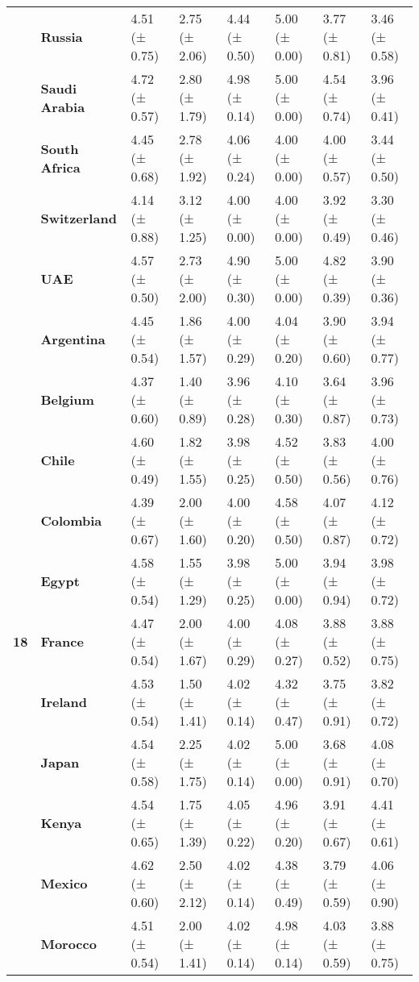 \begin{tabular}{llllllll}
\textbf{} & \textbf{Russia} & 4.51 (± 0.75) & 2.75 (± 2.06) & 4.44 (± 0.50) & 5.00 (± 0.00) & 3.77 (± 0.81) & 3.46 (± 0.58) \\
\textbf{} & \textbf{Saudi Arabia} & 4.72 (± 0.57) & 2.80 (± 1.79) & 4.98 (± 0.14) & 5.00 (± 0.00) & 4.54 (± 0.74) & 3.96 (± 0.41) \\
\textbf{} & \textbf{South Africa} & 4.45 (± 0.68) & 2.78 (± 1.92) & 4.06 (± 0.24) & 4.00 (± 0.00) & 4.00 (± 0.57) & 3.44 (± 0.50) \\
\textbf{} & \textbf{Switzerland} & 4.14 (± 0.88) & 3.12 (± 1.25) & 4.00 (± 0.00) & 4.00 (± 0.00) & 3.92 (± 0.49) & 3.30 (± 0.46) \\
\textbf{} & \textbf{UAE} & 4.57 (± 0.50) & 2.73 (± 2.00) & 4.90 (± 0.30) & 5.00 (± 0.00) & 4.82 (± 0.39) & 3.90 (± 0.36) \\
\cline{1-8}
\multirow[t]{19}{*}{\textbf{18}} & \textbf{Argentina} & 4.45 (± 0.54) & 1.86 (± 1.57) & 4.00 (± 0.29) & 4.04 (± 0.20) & 3.90 (± 0.60) & 3.94 (± 0.77) \\
\textbf{} & \textbf{Belgium} & 4.37 (± 0.60) & 1.40 (± 0.89) & 3.96 (± 0.28) & 4.10 (± 0.30) & 3.64 (± 0.87) & 3.96 (± 0.73) \\
\textbf{} & \textbf{Chile} & 4.60 (± 0.49) & 1.82 (± 1.55) & 3.98 (± 0.25) & 4.52 (± 0.50) & 3.83 (± 0.56) & 4.00 (± 0.76) \\
\textbf{} & \textbf{Colombia} & 4.39 (± 0.67) & 2.00 (± 1.60) & 4.00 (± 0.20) & 4.58 (± 0.50) & 4.07 (± 0.87) & 4.12 (± 0.72) \\
\textbf{} & \textbf{Egypt} & 4.58 (± 0.54) & 1.55 (± 1.29) & 3.98 (± 0.25) & 5.00 (± 0.00) & 3.94 (± 0.94) & 3.98 (± 0.72) \\
\textbf{} & \textbf{France} & 4.47 (± 0.54) & 2.00 (± 1.67) & 4.00 (± 0.29) & 4.08 (± 0.27) & 3.88 (± 0.52) & 3.88 (± 0.75) \\
\textbf{} & \textbf{Ireland} & 4.53 (± 0.54) & 1.50 (± 1.41) & 4.02 (± 0.14) & 4.32 (± 0.47) & 3.75 (± 0.91) & 3.82 (± 0.72) \\
\textbf{} & \textbf{Japan} & 4.54 (± 0.58) & 2.25 (± 1.75) & 4.02 (± 0.14) & 5.00 (± 0.00) & 3.68 (± 0.91) & 4.08 (± 0.70) \\
\textbf{} & \textbf{Kenya} & 4.54 (± 0.65) & 1.75 (± 1.39) & 4.05 (± 0.22) & 4.96 (± 0.20) & 3.91 (± 0.67) & 4.41 (± 0.61) \\
\textbf{} & \textbf{Mexico} & 4.62 (± 0.60) & 2.50 (± 2.12) & 4.02 (± 0.14) & 4.38 (± 0.49) & 3.79 (± 0.59) & 4.06 (± 0.90) \\
\textbf{} & \textbf{Morocco} & 4.51 (± 0.54) & 2.00 (± 1.41) & 4.02 (± 0.14) & 4.98 (± 0.14) & 4.03 (± 0.59) & 3.88 (± 0.75) \\

\end{tabular}
